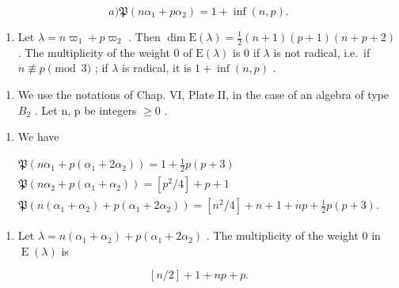 \[
a) \mathfrak {P} (n \alpha_ {1} + p \alpha_ {2}) = 1 + \inf (n, p).
\]

\begin{enumerate}
\def\labelenumi{\alph{enumi})}
\setcounter{enumi}{1}
\tightlist
\item
  Let \(\lambda = n\varpi_1 + p\varpi_2\) . Then \(\dim \mathrm{E}(\lambda) = \frac{1}{2}(n + 1)(p + 1)(n + p + 2)\) . The multiplicity of the weight 0 of \(\mathrm{E}(\lambda)\) is 0 if \(\lambda\) is not radical, i.e.~if \(n \not\equiv p \pmod{3}\) ; if \(\lambda\) is radical, it is \(1 + \inf(n,p)\) .
\end{enumerate}

\begin{enumerate}
\def\labelenumi{\arabic{enumi})}
\setcounter{enumi}{9}
\tightlist
\item
  We use the notations of Chap. VI, Plate II, in the case of an algebra of type \(B_{2}\) . Let n, p be integers \(\geq 0\) .
\end{enumerate}

\begin{enumerate}
\def\labelenumi{\alph{enumi})}
\tightlist
\item
  We have
\end{enumerate}

\[
\begin{array}{c} \mathfrak {P} (n \alpha_ {1} + p (\alpha_ {1} + 2 \alpha_ {2})) = 1 + \frac {1}{2} p (p + 3) \\ \mathfrak {P} (n \alpha_ {2} + p (\alpha_ {1} + \alpha_ {2})) = [ p ^ {2} / 4 ] + p + 1 \\ \mathfrak {P} (n (\alpha_ {1} + \alpha_ {2}) + p (\alpha_ {1} + 2 \alpha_ {2})) = [ n ^ {2} / 4 ] + n + 1 + n p + \frac {1}{2} p (p + 3). \end{array}
\]

\begin{enumerate}
\def\labelenumi{\alph{enumi})}
\setcounter{enumi}{1}
\tightlist
\item
  Let \(\lambda = n(\alpha_{1} + \alpha_{2}) + p(\alpha_{1} + 2\alpha_{2})\) . The multiplicity of the weight 0 in \(\operatorname{E}(\lambda)\) is
\end{enumerate}

\[
[ n / 2 ] + 1 + n p + p.
\]

